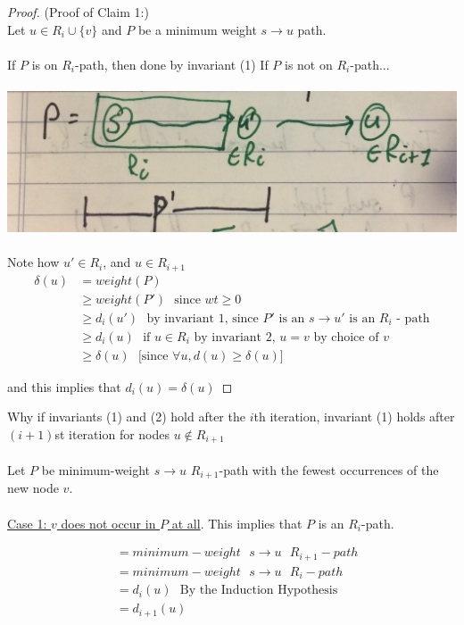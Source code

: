 \documentclass[12pt]{article}
\begin{document}
\begin{proof}
	(Proof of Claim 1:)\\
	Let $u \in R_i \cup \{ v \}$ and $P$ be a minimum weight $s \rightarrow u$ path.\\
	\\
	If $P$ is on $R_i$-path, then done by invariant (1)
	If $P$ is not on $R_i$-path...\\
	\\
	\includegraphics[scale=0.2]{lec3}
	\\
	\\
	Note how $u' \in R_i$, and $u \in R_{i+1}$
	\begin{align*}
		\delta (u) &= weight(P)\\
		&\geq weight(P') \:\:\:\text{since $wt \geq 0$}\\
		&\geq d_i (u') \:\:\:\text{by invariant 1, since $P'$ is an $s \rightarrow u'$ is an $R_i$ - path}\\
		&\geq d_i (u) \:\:\:\text{if $u\in R_i$ by invariant 2, $u=v$ by choice of $v$}\\
		&\geq \delta (u) \:\:\:\text{[since $\forall u, d(u) \geq \delta (u)$]}
	\end{align*}
	
	and this implies that $d_i (u) = \delta (u)$

\end{proof}

Why if invariants (1) and (2) hold after the $i$th iteration, invariant (1) holds after $(i+1)$st iteration for nodes $u \not\in R_{i+1}$\\
\\
Let $P$ be minimum-weight $s\rightarrow u$ $R_{i+1}$-path with the fewest occurrences of the new node $v$.\\
\\
\underline{Case 1: $v$ does not occur in $P$ at all}. This implies that $P$ is an $R_i$-path.

\begin{align*}
	&= minimum-weight\:\:\: s\rightarrow u\:\:\: R_{i+1}-path\\
	&= minimum-weight\:\:\: s\rightarrow u\:\:\: R_{i}-path\\
	&= d_i (u) \:\:\:\text{By the Induction Hypothesis}\\
	&= d_{i+1} (u)
\end{align*}
\end{document}
